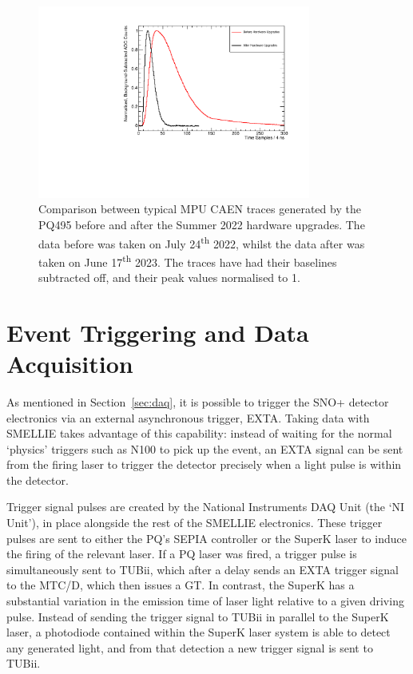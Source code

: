 \begin{figure}
    \centering
    \includegraphics[width=0.8\textwidth]{3_SMELLIEHardware/images/caen_traces_comparison_plot.pdf}
    \caption[Comparison between typical MPU CAEN traces generated by the PQ495 before and after the Summer 2022 hardware upgrades]
    {Comparison between typical MPU CAEN traces generated by the PQ495 before and after the Summer 2022 hardware upgrades. The data before was taken on July 24\textsuperscript{th} 2022, whilst the data after was taken on June 17\textsuperscript{th} 2023. The traces have had their baselines subtracted off, and their peak values normalised to 1.}
    \label{fig:caen_trace_comparison}
\end{figure}

\section{Event Triggering and Data Acquisition}\label{sec:smellie_triggering_daq}
As mentioned in Section~\ref{sec:daq}, it is possible to trigger the SNO+ detector electronics via an external asynchronous trigger, EXTA. Taking data with SMELLIE takes advantage of this capability: instead of waiting for the normal `physics' triggers such as N100 to pick up the event, an EXTA signal can be sent from the firing laser to trigger the detector precisely when a light pulse is within the detector.

Trigger signal pulses are created by the National Instruments DAQ Unit (the `NI Unit'), in place alongside the rest of the SMELLIE electronics. These trigger pulses are sent to either the PQ's SEPIA controller or the SuperK laser to induce the firing of the relevant laser. If a PQ laser was fired, a trigger pulse is simultaneously sent to TUBii, which after a delay sends an EXTA trigger signal to the MTC/D, which then issues a GT. In contrast, the SuperK has a substantial variation in the emission time of laser light relative to a given driving pulse. Instead of sending the trigger signal to TUBii in parallel to the SuperK laser, a photodiode contained within the SuperK laser system is able to detect any generated light, and from that detection a new trigger signal is sent to TUBii.

